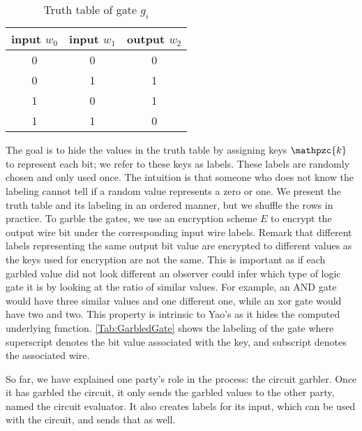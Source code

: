 \begin{center}
    \begin{table}[tbh]
        \centering
        \begin{threeparttable}
            \begin{tabular}{|c | c | c|} 
            \hline
            input $w_0$ & input $w_1$ & output $w_2$ \\ [0.5ex] 
            \hline\hline
            0 & 0 & 0 \\ 
            \hline
            0 & 1 & 1 \\
            \hline
            1 & 0 & 1 \\
            \hline
            1 & 1 & 0 \\ [1ex] 
            \hline
            \end{tabular}
            \caption{Truth table of gate $ g_i $}
            \label{Tab:XORgate}
        \end{threeparttable}
    \end{table}
\end{center}

The goal is to hide the values in the truth table by assigning keys $ \mathpzc{k} $ to represent each bit; we refer to these keys as labels. These labels are randomly chosen and only used once. The intuition is that someone who does not know the labeling cannot tell if a random value represents a zero or one. We present the truth table and its labeling in an ordered manner, but we shuffle the rows in practice. To garble the gates, we use an encryption scheme $ E $ to encrypt the output wire bit under the corresponding input wire labels. Remark that different labels representing the same output bit value are encrypted to different values as the keys used for encryption are not the same. This is important as if each garbled value did not look different an observer could infer which type of logic gate it is by looking at the ratio of similar values. For example, an AND gate would have three similar values and one different one, while an \acrshort{xor} gate would have two and two. This property is intrinsic to Yao's as it hides the computed underlying function. \cref{Tab:GarbledGate} shows the labeling of the gate where superscript denotes the bit value associated with the key, and subscript denotes the associated wire. 

So far, we have explained one party's role in the process: the circuit garbler. Once it has garbled the circuit, it only sends the garbled values to the other party, named the circuit evaluator. It also creates labels for its input, which can be used with the circuit, and sends that as well.

